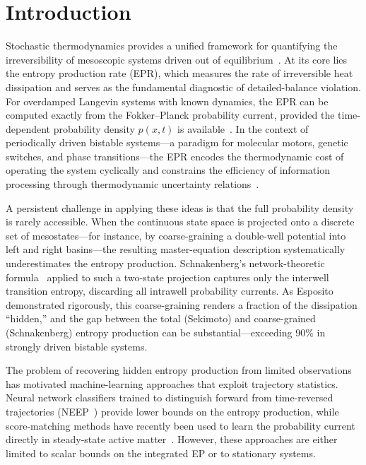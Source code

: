 
\section{Introduction}
\label{sec:introduction}

Stochastic thermodynamics provides a unified framework for quantifying the irreversibility of mesoscopic systems driven out of equilibrium~\cite{Seifert2012}.
At its core lies the entropy production rate (EPR), which measures the rate of irreversible heat dissipation and serves as the fundamental diagnostic of detailed-balance violation.
For overdamped Langevin systems with known dynamics, the EPR can be computed exactly from the Fokker--Planck probability current, provided the time-dependent probability density $p(x,t)$ is available~\cite{Sekimoto2010}.
In the context of periodically driven bistable systems---a paradigm for molecular motors, genetic switches, and phase transitions---the EPR encodes the thermodynamic cost of operating the system cyclically and constrains the efficiency of information processing through thermodynamic uncertainty relations~\cite{Barato2015,Gingrich2016}.

A persistent challenge in applying these ideas is that the full probability density is rarely accessible.
When the continuous state space is projected onto a discrete set of mesostates---for instance, by coarse-graining a double-well potential into left and right basins---the resulting master-equation description systematically underestimates the entropy production.
Schnakenberg's network-theoretic formula~\cite{Schnakenberg1976} applied to such a two-state projection captures only the interwell transition entropy, discarding all intrawell probability currents.
As Esposito~\cite{Esposito2012} demonstrated rigorously, this coarse-graining renders a fraction of the dissipation ``hidden,'' and the gap between the total (Sekimoto) and coarse-grained (Schnakenberg) entropy production can be substantial---exceeding \num{90}\% in strongly driven bistable systems.

The problem of recovering hidden entropy production from limited observations has motivated machine-learning approaches that exploit trajectory statistics.
Neural network classifiers trained to distinguish forward from time-reversed trajectories (NEEP~\cite{Kim2020}) provide lower bounds on the entropy production, while score-matching methods have recently been used to learn the probability current directly in steady-state active matter~\cite{Boffi2024}.
However, these approaches are either limited to scalar bounds on the integrated EP or to stationary systems.

